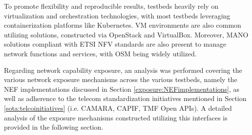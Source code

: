 To promote flexibility and reproducible results, testbeds heavily rely on virtualization and orchestration technologies, with most testbeds leveraging containerization platforms like Kubernetes. \acf{VM} environments are also common utilizing solutions, constructed via OpenStack and VirtualBox.  Moreover, \acs{MANO} solutions compliant with \acs{ETSI} \acs{NFV} standards are also present to manage network functions and services, with \acf{OSM} being widely utilized.


Regarding network capability exposure, an analysis was performed covering the various network exposure mechanisms across the various testbeds, namely the \acs{NEF} implementations discussed in Section \ref{exposure:NEFimplementations}, as well as adherence to the telecom standardization initiatives mentioned in Section \ref{sota:telcoinitiatives} (i.e. CAMARA, \acs{CAPIF}, \acs{TMF} Open \acsp{API}). A detailed analysis of the exposure mechanisms constructed utilizing this interfaces is provided in the following section.

